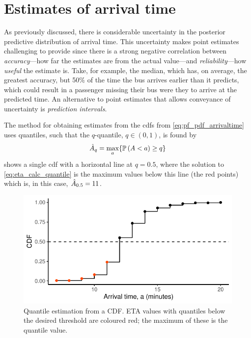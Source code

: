 \section{Estimates of arrival time}
\label{sec:eta_estimates}

As previously discussed, there is considerable uncertainty in the posterior predictive distribution of arrival time. This uncertainty makes point estimates challenging to provide since there is a strong negative correlation between \emph{accuracy}---how far the estimates are from the actual value---and \emph{reliability}---how \emph{useful} the estimate is. Take, for example, the median, which has, on average, the greatest accuracy, but 50\% of the time the bus arrives earlier than it predicts, which could result in a passenger missing their bus were they to arrive at the predicted time. An alternative to point estimates that allows conveyance of uncertainty is \emph{prediction intervals}.

The method for obtaining estimates from the \glspl{cdf} from \cref{eq:pf_pdf_arrivaltime} uses quantiles, such that the $q$-quantile, $q\in(0,1)$, is found by
\begin{equation}
\label{eq:eta_calc_quantile}
\hat{A}_q = \max_a\{\mathbb{P}\left(A < a\right) \geq q\}
\end{equation}
 shows a single \gls{cdf} with a horizontal line at $q = 0.5$, where the solution to \cref{eq:eta_calc_quantile} is the maximum values below this line (the red points) which is, in this case, $\hat{A}_{0.5} = 11$.


\begin{knitrout}\small
{}\color{fgcolor}\begin{figure}

{\centering \includegraphics[width=.6\textwidth]{figure/eta_calc_quantile-1} 

}

\caption[Quantile estimation from a CDF]{Quantile estimation from a CDF. ETA values with quantiles below the desired threshold are coloured red; the maximum of these is the quantile value.}\label{fig:eta_calc_quantile}
\end{figure}


\end{knitrout}




